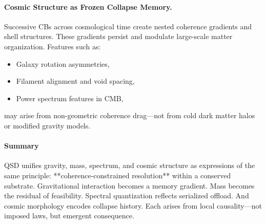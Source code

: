 \documentclass[preprints,article,submit,pdftex,moreauthors]{Definitions/mdpi}
\begin{document}
\paragraph{Cosmic Structure as Frozen Collapse Memory.}
Successive CBs across cosmological time create nested coherence gradients and shell structures. These gradients persist and modulate large-scale matter organization. Features such as:
\begin{itemize}
  \item Galaxy rotation asymmetries,
  \item Filament alignment and void spacing,
  \item Power spectrum features in CMB,
\end{itemize}
may arise from non-geometric coherence drag—not from cold dark matter halos or modified gravity models.

\paragraph{Summary}
QSD unifies gravity, mass, spectrum, and cosmic structure as expressions of the same principle: **coherence-constrained resolution** within a conserved substrate. Gravitational interaction becomes a memory gradient. Mass becomes the residual of feasibility. Spectral quantization reflects serialized offload. And cosmic morphology encodes collapse history. Each arises from local causality—not imposed laws, but emergent consequence.








\isPreprints{}{%
\begin{adjustwidth}{-\extralength}{0cm}
} %



% 
\end{document}
